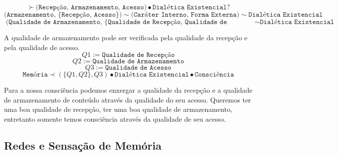 \documentclass[10pt,a4paper]{report}
\begin{document}
$$ \succ \texttt{(Recepção, Armazenamento, Acesso)} \bullet \texttt{Dialética Existencial} ? $$
$$ \texttt{(Armazenamento, \{Recepção, Acesso\})} \sim \texttt{(Caráter Interno, Forma Externa)} \sim \texttt{Dialética Existencial} $$
$$ \texttt{(Qualidade de Armazenamento, \{Qualidade de Recepção, Qualidade de Acesso\})} \sim \texttt{Dialética Existencial} $$
\hrulefill

A qualidade de armazenamento pode ser verificada pela qualidade da recepção e pela qualidade de acesso.\\

$$ Q1:= \texttt{Qualidade de Recepção} $$
$$ Q2:= \texttt{Qualidade de Armazenamento} $$
$$ Q3:= \texttt{Qualidade de Acesso} $$
$$  \texttt{Memória} \prec (\{Q1,Q2\} , Q3) \bullet \texttt{Dialética Existencial} \bullet \texttt{Consciência} $$
\hrulefill

Para a nossa consciência podemos enxergar a qualidade da recepção e a qualidade de armazenamento de conteúdo através da qualidade do seu acesso. Queremos ter uma boa qualidade de recepção, ter uma boa qualidade de armazenamento, entretanto somente temos consciência através da qualidade de seu acesso. 






\subsection{Redes e Sensação de Memória}
\end{document}
